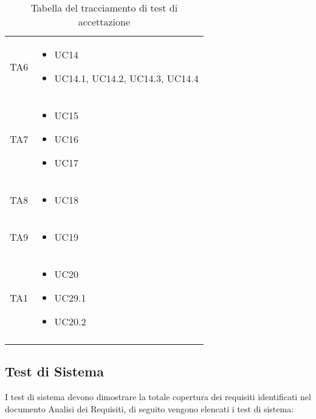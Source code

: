 {\begin{longtable}{C{.3\freewidth} C{.3\freewidth}}
    
    TA6 & \begin{itemize}
        \item UC14
        \item UC14.1, UC14.2, UC14.3, UC14.4
    \end{itemize} \\

    
    TA7 & \begin{itemize}
        \item UC15
        \item UC16
        \item UC17
    \end{itemize} \\

    
    TA8 & \begin{itemize}
        \item UC18
    \end{itemize} \\

    
    TA9 & \begin{itemize}
        \item UC19
    \end{itemize} \\

    TA1 & \begin{itemize}
        \item UC20
        \item UC29.1
        \item UC20.2
    \end{itemize} \\

\bottomrule
{}
\caption{Tabella del tracciamento di test di accettazione}
\end{longtable}

}

\subsection{Test di Sistema}
I test di sistema devono dimostrare la totale copertura dei requisiti identificati nel documento Analisi dei Requisiti, di seguito vengono elencati i test di sistema:

